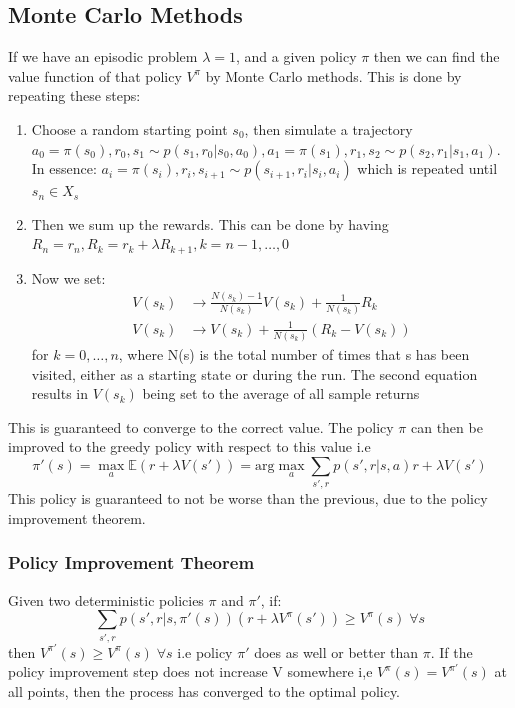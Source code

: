 \documentclass{article}
\begin{document}
\subsection{Monte Carlo Methods}
If we have an episodic problem $\lambda = 1$, and a given policy $\pi$ then we can find the value function of that policy $V^\pi$ by Monte Carlo methods. This is done by repeating these steps:
\begin{enumerate}
    \item Choose a random starting point $s_0$, then simulate a trajectory $a_0 = \pi(s_0), r_0, s_1 \sim p(s_1,r_0|s_0,a_0), a_1 = \pi(s_1),r_1, s_2 \sim p(s_2,r_1 |s_1,a_1)$.  \\
    In essence:
    $a_i = \pi(s_i),r_i,s_{i+1} \sim p(s_{i+1}, r_i | s_i,a_i)$ which is repeated until $s_n \in X_s$
    \item Then we sum up the rewards. This can be done by having $R_n = r_n, R_k = r_k + \lambda R_{k+1}, k=n-1, \hdots, 0$
    \item Now we set:
    \[
    \begin{aligned}
    V(s_k) &\rightarrow \frac{N(s_k) -1}{N(s_k)} V(s_k) + \frac{1}{N(s_k)} R_k \\
    V(s_k) &\rightarrow V(s_k) + \frac{1}{N(s_k)} (R_k - V(s_k))
    \end{aligned}
    \]
    for $k=0,\hdots,n$, where N(s) is the total number of times that s has been visited, either as a starting state or during the run. The second equation results in $V(s_k)$ being set to the average of all sample returns
\end{enumerate}
This is guaranteed to converge to the correct value. The policy $\pi$ can then be improved to the greedy policy with respect to this value i.e
\[
\pi'(s) = \max_a \mathbb E(r + \lambda V(s')) = \text{arg} \max_a \sum_{s',r} p(s',r|s,a) r + \lambda V(s')
\]
This policy is guaranteed to not be worse than the previous, due to the policy improvement theorem. \\
\subsubsection*{Policy Improvement Theorem}
Given two deterministic policies $\pi$ and $\pi'$, if:
\[
\sum_{s',r} p(s',r|s,\pi'(s)) (r + \lambda V^\pi(s')) \geq V^\pi(s) \; \forall s
\]
then $V^{\pi'}(s) \geq V^\pi (s) \; \forall s$ i.e policy $\pi'$ does as well or better than $\pi$. If the policy improvement step does not increase V somewhere i,e $V^\pi(s) = V^{\pi'}(s)$ at all points, then the process has converged to the optimal policy.  
\end{document}
